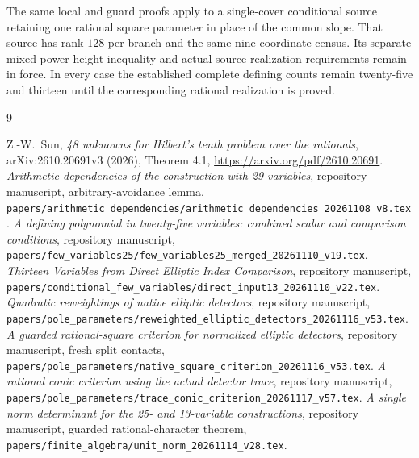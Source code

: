 \documentclass[11pt,a4paper]{article}
\begin{document}
The same local and guard proofs apply to a single-cover conditional
source retaining one rational square parameter in place of the common
slope. That source has rank $128$ per branch and the same nine-coordinate
census. Its separate mixed-power height inequality and actual-source
realization requirements remain in force. In every case the established
complete defining counts remain twenty-five and thirteen until the
corresponding rational realization is proved.

\begin{thebibliography}{9}\raggedright
{}Z.-W.~Sun,
\emph{48 unknowns for Hilbert's tenth problem over the rationals},
arXiv:2610.20691v3 (2026), Theorem 4.1,
\url{https://arxiv.org/pdf/2610.20691}.
\emph{Arithmetic dependencies of the construction
with 29 variables}, repository manuscript, arbitrary-avoidance lemma,
\nolinkurl{papers/arithmetic_dependencies/arithmetic_dependencies_20261108_v8.tex}.
\emph{A defining polynomial in twenty-five variables:
combined scalar and comparison conditions}, repository manuscript,
\nolinkurl{papers/few_variables25/few_variables25_merged_20261110_v19.tex}.
\emph{Thirteen Variables from Direct Elliptic
Index Comparison}, repository manuscript,
\nolinkurl{papers/conditional_few_variables/direct_input13_20261110_v22.tex}.
\emph{Quadratic reweightings of native elliptic
detectors}, repository manuscript,
\nolinkurl{papers/pole_parameters/reweighted_elliptic_detectors_20261116_v53.tex}.
\emph{A guarded rational-square criterion for normalized
elliptic detectors}, repository manuscript, fresh split contacts,
\nolinkurl{papers/pole_parameters/native_square_criterion_20261116_v53.tex}.
\emph{A rational conic criterion using the actual detector
trace}, repository manuscript,
\nolinkurl{papers/pole_parameters/trace_conic_criterion_20261117_v57.tex}.
\emph{A single norm determinant for the 25- and 13-variable
constructions}, repository manuscript, guarded rational-character theorem,
\nolinkurl{papers/finite_algebra/unit_norm_20261114_v28.tex}.
\end{thebibliography}
\end{document}
